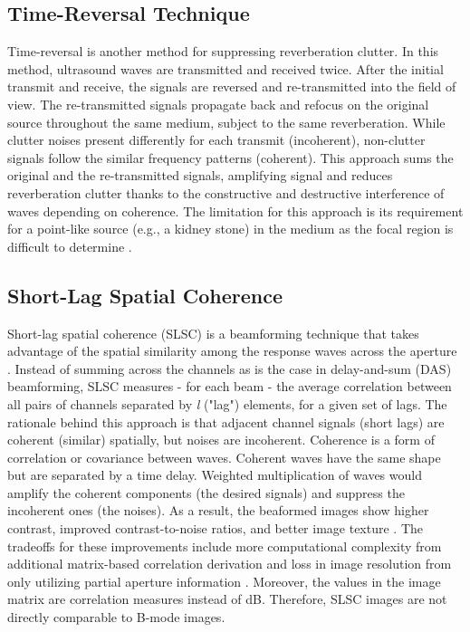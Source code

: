     \subsection{Time-Reversal Technique}
      Time-reversal is another method for suppressing reverberation clutter. In this method, ultrasound waves are transmitted and received twice. After the initial transmit and receive, the signals are reversed and re-transmitted into the field of view. The re-transmitted signals propagate back and refocus on the original source throughout the same medium, subject to the same reverberation. While clutter noises present differently for each transmit (incoherent), non-clutter signals follow the similar frequency patterns (coherent). This approach sums the original and the re-transmitted signals, amplifying signal and reduces reverberation clutter thanks to the constructive and destructive interference of waves depending on coherence. The limitation for this approach is its requirement for a point-like source (e.g., a kidney stone) in the medium as the focal region is difficult to determine \cite{dei_thesis, fink1992time}.


    \subsection{Short-Lag Spatial Coherence}
      Short-lag spatial coherence (SLSC) is a beamforming technique that takes advantage of the spatial similarity among the response waves across the aperture \cite{slsc}. Instead of summing across the channels as is the case in delay-and-sum (DAS) beamforming, SLSC measures - for each beam - the average correlation between all pairs of channels separated by \textit{l} ("lag") elements, for a given set of lags. The rationale behind this approach is that adjacent channel signals (short lags) are coherent (similar) spatially, but noises are incoherent. Coherence is a form of correlation or covariance between waves. Coherent waves have the same shape but are separated by a time delay. Weighted multiplication of waves would amplify the coherent components (the desired signals) and suppress the incoherent ones (the noises). As a result, the beaformed images show higher contrast, improved contrast-to-noise ratios, and better image texture \cite{dahl2017coherence}. The tradeoffs for these improvements include more computational complexity from additional matrix-based correlation derivation and loss in image resolution from only utilizing partial aperture information \cite{lediju2015resolution}. Moreover, the values in the image matrix are correlation measures instead of dB. Therefore, SLSC images are not directly comparable to B-mode images.

